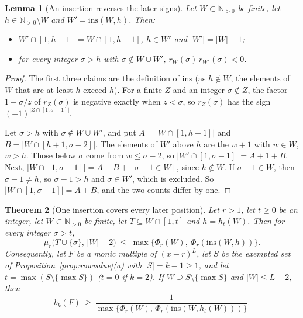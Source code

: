 \documentclass[11pt]{article}
\newtheorem{theorem}{Theorem}[section]
\newtheorem{lemma}[theorem]{Lemma}
\newcommand{\N}{\mathbb N}
\begin{document}
\begin{lemma}[An insertion reverses the later signs]\label{lem:insflip}
Let $W\subset\N_{>0}$ be finite, let $h\in\N_{>0}\setminus W$ and
$W'=\mathrm{ins}(W,h)$.  Then:
\begin{itemize}
\item $W'\cap[1,h-1]=W\cap[1,h-1]$, $h\in W'$ and $|W'|=|W|+1$;
\item for every integer $\sigma>h$ with $\sigma\notin W\cup W'$,
$r_W(\sigma)\,r_{W'}(\sigma)<0$.
\end{itemize}
\end{lemma}

\begin{proof}
The first three claims are the definition of $\mathrm{ins}$ (as $h\notin W$,
the elements of $W$ that are at least $h$ exceed $h$).  For a finite $Z$ and
an integer $\sigma\notin Z$, the factor $1-\sigma/z$ of $r_Z(\sigma)$ is
negative exactly when $z<\sigma$, so $r_Z(\sigma)$ has the sign
$(-1)^{|Z\cap[1,\sigma-1]|}$.

Let $\sigma>h$ with $\sigma\notin W\cup W'$, and put
$A=|W\cap[1,h-1]|$ and $B=|W\cap[h+1,\sigma-2]|$.  The elements of $W'$
above $h$ are the $w+1$ with $w\in W$, $w>h$.  Those below $\sigma$ come
from $w\le\sigma-2$, so $|W'\cap[1,\sigma-1]|=A+1+B$.  Next,
$|W\cap[1,\sigma-1]|=A+B+[\sigma-1\in W]$, since $h\notin W$.  If
$\sigma-1\in W$, then $\sigma-1\ne h$, so $\sigma-1>h$ and $\sigma\in W'$,
which is excluded.  So $|W\cap[1,\sigma-1]|=A+B$, and the two counts differ
by one.
\end{proof}

\begin{theorem}[One insertion covers every later position]\label{thm:crossing}
Let $r>1$, let $t\ge0$ be an integer, let $W\subset\N_{>0}$ be finite, let
$T\subseteq W\cap[1,t]$ and $h=h_t(W)$.  Then for every integer $\sigma>t$,
\[
  \mu_r\bigl(T\cup\{\sigma\},\,|W|+2\bigr)\ \le\
  \max\bigl\{\Phi_r(W),\ \Phi_r(\mathrm{ins}(W,h))\bigr\}.
\]
Consequently, let $F$ be a monic multiple of $(x-r)^L$, let $S$ be the
exempted set of Proposition~\ref{prop:rowvalue}(a) with $|S|=k-1\ge1$, and
let $t=\max(S\setminus\{\max S\})$ ($t=0$ if $k=2$).  If $W\supseteq S\setminus\{\max S\}$
and $|W|\le L-2$, then
\[
  b_k(F)\ \ge\ \frac1{\max\{\Phi_r(W),\,\Phi_r(\mathrm{ins}(W,h_t(W)))\}} .
\]
\end{theorem}
\end{document}

